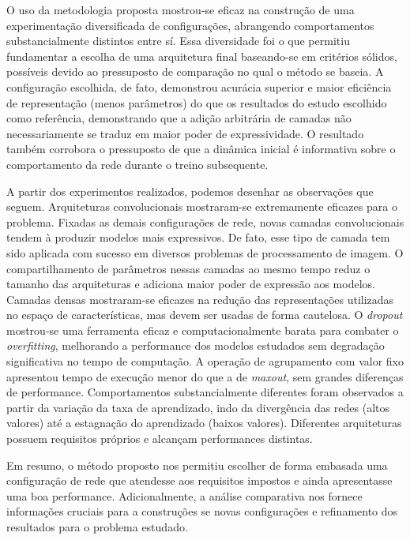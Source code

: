 O uso da metodologia proposta mostrou-se eficaz na construção de uma experimentação diversificada de configurações, abrangendo comportamentos substancialmente distintos entre sí. Essa diversidade foi o que permitiu fundamentar a escolha de uma arquitetura final baseando-se em critérios sólidos, possíveis devido ao pressuposto de comparação no qual o método se baseia. A configuração escolhida, de fato, demonstrou acurácia superior e maior eficiência de representação (menos parâmetros) do que os resultados do estudo escolhido como referência, demonstrando que a adição arbitrária de camadas não necessariamente se traduz em maior poder de expressividade. O resultado também corrobora o pressuposto de que a dinâmica inicial é informativa sobre o comportamento da rede durante o treino subsequente.

A partir dos experimentos realizados, podemos desenhar as observações que seguem. Arquiteturas convolucionais mostraram-se extremamente eficazes para o problema. Fixadas as demais configurações de rede, novas camadas convolucionais tendem à produzir modelos mais expressivos. De fato, esse tipo de camada tem sido aplicada com sucesso em diversos problemas de processamento de imagem. O compartilhamento de parâmetros nessas camadas ao mesmo tempo reduz o tamanho das arquiteturas e adiciona maior poder de expressão aos modelos. Camadas densas mostraram-se eficazes na redução das representações utilizadas no espaço de características, mas devem ser usadas de forma cautelosa. O \textit{dropout} mostrou-se uma ferramenta eficaz e computacionalmente barata para combater o \textit{overfitting}, melhorando a performance dos modelos estudados sem degradação significativa no tempo de computação. A operação de agrupamento com valor fixo apresentou tempo de execução menor do que a de \textit{maxout}, sem grandes diferenças de performance. Comportamentos substancialmente diferentes foram observados a partir da variação da taxa de aprendizado, indo da divergência das redes (altos valores) até a estagnação do aprendizado (baixos valores). Diferentes arquiteturas possuem requisitos próprios e alcançam performances distintas.

Em resumo, o método proposto nos permitiu escolher de forma embasada uma configuração de rede que atendesse aos requisitos impostos e ainda apresentasse uma boa performance. Adicionalmente, a análise comparativa nos fornece informações cruciais para a construções se novas configurações e refinamento dos resultados para o problema estudado.  